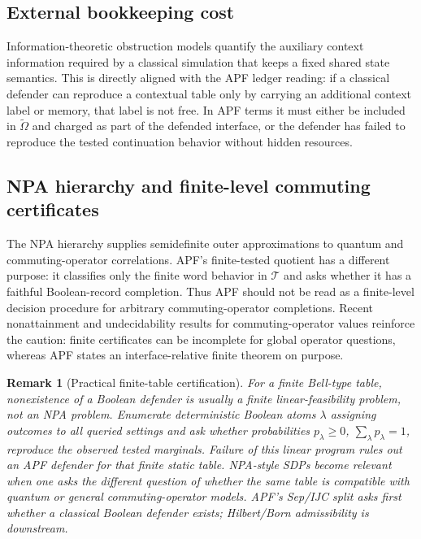 \documentclass[11pt]{article}
\newtheorem{remark}[theorem]{Remark}
\begin{document}
\subsection*{External bookkeeping cost}
Information-theoretic obstruction models quantify the auxiliary context information required by a classical simulation that keeps a fixed shared state semantics.  This is directly aligned with the APF ledger reading: if a classical defender can reproduce a contextual table only by carrying an additional context label or memory, that label is not free.  In APF terms it must either be included in $\widetilde\Omega$ and charged as part of the defended interface, or the defender has failed to reproduce the tested continuation behavior without hidden resources.


\subsection*{NPA hierarchy and finite-level commuting certificates}
The NPA hierarchy supplies semidefinite outer approximations to quantum and commuting-operator correlations.  APF's finite-tested quotient has a different purpose: it classifies only the finite word behavior in $\mathcal T$ and asks whether it has a faithful Boolean-record completion.  Thus APF should not be read as a finite-level decision procedure for arbitrary commuting-operator completions.  Recent nonattainment and undecidability results for commuting-operator values reinforce the caution: finite certificates can be incomplete for global operator questions, whereas APF states an interface-relative finite theorem on purpose.

\begin{remark}[Practical finite-table certification]
For a finite Bell-type table, nonexistence of a Boolean defender is usually a finite linear-feasibility problem, not an NPA problem.  Enumerate deterministic Boolean atoms \(\lambda\) assigning outcomes to all queried settings and ask whether probabilities \(p_\lambda\ge0\), \(\sum_\lambda p_\lambda=1\), reproduce the observed tested marginals.  Failure of this linear program rules out an APF defender for that finite static table.  NPA-style SDPs become relevant when one asks the different question of whether the same table is compatible with quantum or general commuting-operator models.  APF's Sep/IJC split asks first whether a classical Boolean defender exists; Hilbert/Born admissibility is downstream.
\end{remark}
\end{document}
